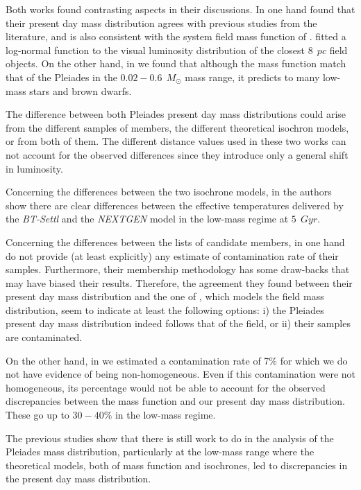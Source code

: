 Both works found contrasting aspects in their discussions. In one hand \citet{Lodieu2012} found that their present day mass distribution agrees with previous studies from the literature, and is also consistent with the system field mass function of \citet{Chabrier2005}. \citet{Chabrier2005} fitted a log-normal function to the visual luminosity distribution of the closest $8 \ \ pc$ field objects. On the other hand, in \citet{Bouy2015} we found that although the \citet{Chabrier2005} mass function match that of the Pleiades in the $0.02-0.6\ \ M_{\odot}$ mass range, it predicts to many low-mass stars and brown dwarfs. 

The difference between both Pleiades present day mass distributions could arise from the different samples of members, the different theoretical isochron models, or from both of them. The different distance values used in these two works can not account for the observed differences since they introduce only a general shift in luminosity. 

Concerning the differences between the two isochrone models, in \citet{2013MmSAI..84.1053A} the authors show there are clear differences between the effective temperatures delivered by the \emph{BT-Settl} and the \emph{NEXTGEN} model in the low-mass regime at $5 \ \ Gyr$.  

Concerning the differences between the lists of candidate members, in one hand \citet{Lodieu2012} do not provide (at least explicitly) any estimate of contamination rate of their samples. Furthermore, their membership methodology has some draw-backs \cite[see][]{Sarro2014} that may have biased their results. Therefore, the agreement they found between their present day mass distribution and the one of \citet{Chabrier2005}, which models the field mass distribution, seem to indicate at least the following options: i) the Pleiades present day mass distribution indeed follows that of the field, or ii) their samples are contaminated.  

On the other hand, in \citet{Bouy2015} we estimated a contamination rate of 7\% for which we do not have evidence of being non-homogeneous. Even if this contamination were not homogeneous, its percentage would not be able to account for the observed discrepancies between the \citet{Chabrier2005} mass function and our present day mass distribution. These go up to $30-40\%$ in the low-mass regime.

The previous studies show that there is still work to do in the analysis of the Pleiades mass distribution, particularly at the low-mass range where the theoretical models, both of mass function and isochrones, led to discrepancies in the present day mass distribution.  

